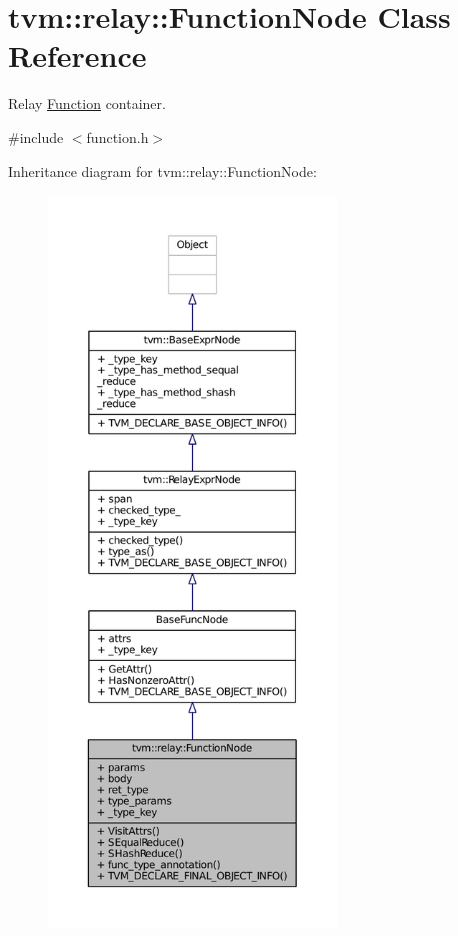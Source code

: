 \hypertarget{classtvm_1_1relay_1_1FunctionNode}{}\section{tvm\+:\+:relay\+:\+:Function\+Node Class Reference}
\label{classtvm_1_1relay_1_1FunctionNode}


Relay \hyperlink{classtvm_1_1relay_1_1Function}{Function} container.  




{\ttfamily \#include $<$function.\+h$>$}



Inheritance diagram for tvm\+:\+:relay\+:\+:Function\+Node\+:
\nopagebreak
\begin{figure}[H]
\begin{center}
\leavevmode
\includegraphics[height=550pt]{classtvm_1_1relay_1_1FunctionNode__inherit__graph}
\end{center}
\end{figure}



